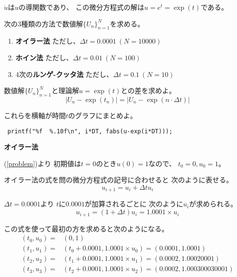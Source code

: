 \documentclass[12pt,b5paper]{ltjsarticle}
\begin{document}
$\dot{u}$は$u$の導関数であり、
この微分方程式の解は$u = e^t = \exp(t)$である。


次の3種類の方法で数値解$\{U_n\}_{n=1}^{N}$を求める。
\begin{enumerate}
 \item
      \textbf{オイラー法}
      \quad
      ただし、$\Delta t = 0.0001 \ (N=10000)$

 \item
      \textbf{ホイン法}
      \quad
      ただし、$\Delta t = 0.01 \ (N=100)$

 \item
      4次の\textbf{ルンゲ-クッタ法}
      \quad
      ただし、$\Delta t = 0.1 \ (N=10)$
\end{enumerate}

数値解$\{U_n\}_{n=1}^{N}$と理論解$u=\exp(t)$との差を求めよ。
\begin{equation}
 \lvert U_n -\exp(t_n)\rvert = \lvert U_n -\exp(n\cdot \Delta t)\rvert
\end{equation}

これらを横軸が時間$t$のグラフにまとめよ。

\begin{lstlisting}
 printf("%f  %.10f\n", i*DT, fabs(u-exp(i*DT)));
\end{lstlisting}


\dotfill
\textbf{オイラー法}
\dotfill

(\ref{problem})より
初期値は$t=0$のとき$u(0)=1$なので、
$t_0=0,u_0=1$。

オイラー法の式を問の微分方程式の記号に合わせると
次のように表せる。
\begin{equation}
 u_{i+1} = u_{i} + \Delta t u_{i}
\end{equation}

$\Delta t=0.0001$より
$t$に$0.0001$が加算されるごとに
次のように$u_{i}$が求められる。
\begin{equation}
 u_{i+1} = (1+\Delta t)u_{i} = 1.0001 \times u_{i}
  \label{euler}
\end{equation}

この式を使って最初の方を求めると次のようになる。
\begin{align}
 (t_0,u_0)=&(0,1)\\
 (t_1,u_1)=&(t_0+0.0001,1.0001\times u_0)=(0.0001,1.0001)\\
 (t_2,u_2)=&(t_1+0.0001,1.0001\times u_1)=(0.0002,1.00020001)\\
 (t_3,u_3)=&(t_2+0.0001,1.0001\times u_2)=(0.0002,1.000300030001)
\end{align}
\end{document}
